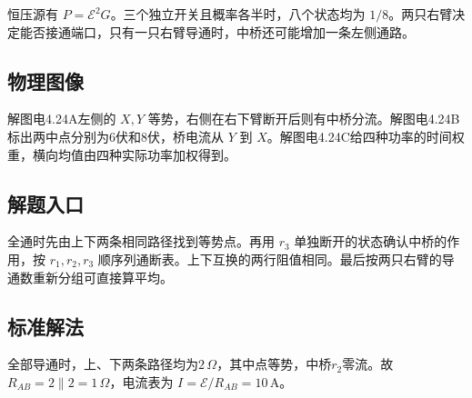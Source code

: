 \documentclass[UTF8,fontset=fandol,a4paper,11pt]{ctexart}
\begin{document}
恒压源有 $P=\mathcal E^2G$。三个独立开关且概率各半时，八个状态均为 $1/8$。两只右臂决定能否接通端口，只有一只右臂导通时，中桥还可能增加一条左侧通路。



\subsection*{物理图像}

解图电4.24A左侧的 $X,Y$ 等势，右侧在右下臂断开后则有中桥分流。解图电4.24B标出两中点分别为6伏和8伏，桥电流从 $Y$ 到 $X$。解图电4.24C给四种功率的时间权重，横向均值由四种实际功率加权得到。



\subsection*{解题入口}

全通时先由上下两条相同路径找到等势点。再用 $r_3$ 单独断开的状态确认中桥的作用，按 $r_1,r_2,r_3$ 顺序列通断表。上下互换的两行阻值相同。最后按两只右臂的导通数重新分组可直接算平均。


\subsection*{标准解法}

全部导通时，上、下两条路径均为$2\,\Omega$，其中点等势，中桥$r_2$零流。故$R_{AB}=2\parallel2=1\,\Omega$，电流表为
$I=\mathcal E/R_{AB}=10\,\mathrm A$。
\end{document}
